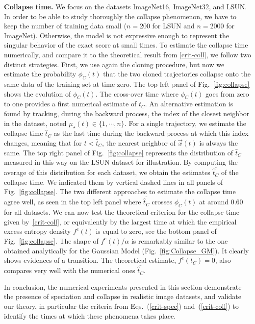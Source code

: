 \documentclass[10pt,twocolumn]{article}
\begin{document}
{\bf Collapse time.} We focus on the datasets ImageNet16, ImageNet32, and LSUN. In order to be able to study thoroughly the collapse phenomenon, we have to keep the number of training data small ($n=200$ for LSUN and $n=2000$ for ImageNet). Otherwise, the model is not expressive enough to represent the singular behavior of the exact score at small times.
To estimate the collapse time numerically, and compare it to the theoretical result from \eqref{crit-coll}, we follow two distinct strategies. First, we use again the cloning procedure, but now we estimate the probability $\phi_C(t)$ that the two cloned trajectories collapse onto the same data of the training set at time zero.
The top left panel of Fig.~\ref{fig:collapse} shows the evolution of $\phi_C(t)$. The cross-over time where $\phi_C(t)$ goes from zero to one provides a first numerical estimate of $t_C$. An alternative estimation is found by tracking, during the backward process, the index of the closest neighbor in the dataset, noted $\mu_\star(t) \in \{1, \cdots, n\}$. For a single trajectory, we estimate the collapse time $\hat{t}_C$ as the last time during the backward process at which this index changes, meaning that for $t < \hat{t}_C$, the nearest neighbor of $\vec x(t)$ is always the same. The top right panel of Fig.~\ref{fig:collapse} represents the distribution of $\hat{t}_C$ measured in this way on the LSUN dataset for illustration. By computing the average of this distribution for each dataset, we obtain the estimates $\overline{\hat{t}_C}$ of the collapse time. We indicated them by vertical dashed lines in all panels of Fig.~\ref{fig:collapse}. The two different approaches to estimate the collapse time agree well, as seen in the top left panel where $\overline{\hat{t}_C}$ crosses $\phi_C(t)$ at around $0.60$ for all datasets.
We can now test the theoretical criterion for the collapse time given by~\eqref{crit-coll}, or equivalently by the largest time at which the empirical excess entropy density $f^e(t)$ is equal to zero, see the bottom panel of Fig.~\ref{fig:collapse}. The shape of $f^e(t)/\alpha$ is remarkably similar to the one obtained analytically for the Gaussian Model (Fig.~\ref{fig:Collapse_GM}). It clearly shows evidences of a transition.
The theoretical estimate, $f^e(t_C)=0$, also compares very well with the numerical ones $\overline{\hat{t}_C}$.

In conclusion, the numerical experiments presented in this section demonstrate the presence of speciation and collapse in realistic image datasets, and validate our theory, in particular the criteria from Eqs.~(\ref{crit-spec}) and~(\ref{crit-coll}) to identify the times at which these phenomena takes place.
\end{document}
